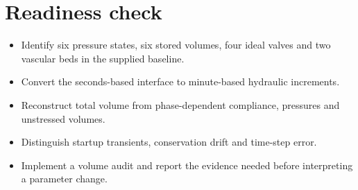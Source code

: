 \documentclass[11pt,letterpaper]{article}
\theoremstyle{definition}\newtheorem{definition}{Definition}\newtheorem{example}{Example}
\numberwithin{equation}{section}
\begin{document}
\section*{Readiness check}
\begin{itemize}
\item Identify six pressure states, six stored volumes, four ideal valves and two vascular beds in the supplied baseline.
\item Convert the seconds-based interface to minute-based hydraulic increments.
\item Reconstruct total volume from phase-dependent compliance, pressures and unstressed volumes.
\item Distinguish startup transients, conservation drift and time-step error.
\item Implement a volume audit and report the evidence needed before interpreting a parameter change.
\end{itemize}
\end{document}
